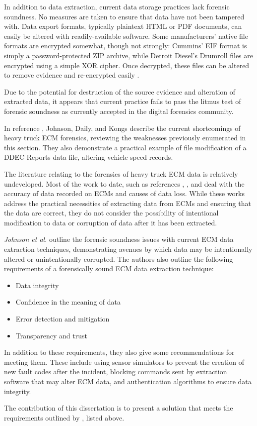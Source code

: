 In addition to data extraction, current data storage practices lack forensic soundness. No measures are taken to ensure that data have not been tampered
with. Data export formats, typically plaintext HTML or PDF documents, can easily be altered with readily-available software. Some manufacturers' native file formats are encrypted
somewhat, though not strongly: Cummins' EIF format is simply a password-protected ZIP archive, while Detroit Diesel's Drumroll files are encrypted using a simple XOR cipher.
Once decrypted, these files can be altered to remove evidence and re-encrypted easily \cite{Johnson2014}.

Due to the potential for destruction of the source evidence and alteration of extracted data, it appears that current practice fails to pass the litmus test of forensic soundness
as currently accepted in the digital forensics community.

In reference \cite{Johnson2014}, Johnson, Daily, and Kongs describe the current shortcomings of heavy truck ECM forensics, reviewing the weaknesses previously enumerated in this section. They also
demonstrate a practical example of file modification of a DDEC Reports data file, altering vehicle speed records.


The literature relating to the forensics of heavy truck ECM data is relatively undeveloped. Most of the work to date, such as references \cite{reust2004}, \cite{steiner2013}, and \cite{austin2011} deal
with the accuracy of data recorded on ECMs and causes of data loss. While these works address the practical necessities of extracting data from ECMs and ensuring that the data are
correct, they do not consider the possibility of intentional modification to data or corruption of data after it has been extracted.

\emph{Johnson et al.} \cite{Johnson2014} outline the forensic soundness issues with current ECM data extraction techniques, demonstrating avenues by which data may be intentionally altered or unintentionally corrupted. The authors also outline the following requirements of a forensically sound ECM data extraction technique:

\begin{itemize}
  \item Data integrity
  \item Confidence in the meaning of data
  \item Error detection and mitigation
  \item Transparency and trust
\end{itemize}

In addition to these requirements, they also give some recommendations for meeting them. These include using sensor simulators to prevent the creation of new fault codes
after the incident, blocking commands sent by extraction software that may alter ECM data, and authentication algorithms to ensure data integrity.

The contribution of this dissertation is to present a solution that meets the requirements outlined by \cite{Johnson2014}, listed above.
